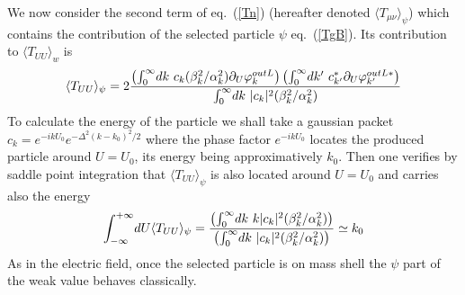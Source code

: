 \documentclass[12pt,oneside]{report}
\def\p {\prime}
\begin{document}
We now consider the second term of eq.~(\ref{Tn}) (hereafter denoted 
$\langle T_{\mu\nu}\rangle_{\psi}$)
which contains
the contribution of the selected particle $\psi$ eq.~(\ref{TgB}). 
Its contribution to $\langle T_{UU}\rangle_w$ is
\begin{equation}
\langle T_{UU}\rangle_{\psi} =2{
 \left(\int_0^\infty \! dk\ 
c_k (\beta_k^2 /\alpha_k^2) \partial_U \varphi^{out  L}_k\right)\left(
\int_0^\infty \! dk^\p\ 
c_{k^\p}^* 
\partial_U \varphi^{out L *}_{k^\p}\right)
\over 
\int_0^\infty \! dk\ 
\vert c_k \vert^2 ( \beta_k^2/ \alpha_k^2)
}
\label{To}
\end{equation}
To calculate the energy of the particle we shall take a
gaussian packet  $c_k = e^{-ik U_0} e^{-\Delta^2
(k-k_0)^2/2}$ where the phase factor $e^{-ik U_0}$ locates the
produced particle around $U=U_0$, its energy being
approximatively $k_0$. Then one verifies by saddle point
integration that $\langle T_{UU}\rangle_{\psi}$ is also
located around $U=U_0$
and carries also the energy 
\begin{equation}
\int_{-\infty}^{+\infty}\!dU
\langle T_{UU}\rangle_{\psi} = {{\left(\int_0^\infty\!dk\ k \vert c_k
\vert^2 ( \beta_k^2/ \alpha_k^2) \right)}\over{\left(
\int_0^\infty\!dk\ \vert c_k
\vert^2 ( \beta_k^2/ \alpha_k^2) \right)}}\simeq k_0
\label{ToB}\end{equation}
As in the electric field, once the selected particle is on mass shell
the $\psi$ part of the weak value behaves classically.
\end{document}
